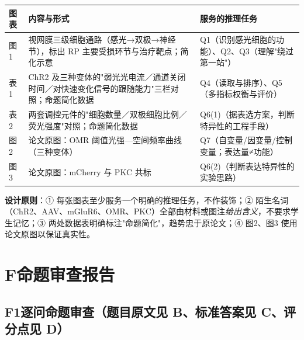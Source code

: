 \documentclass[UTF8,a4paper,11pt]{ctexart}
\begin{document}
\begin{longtable}{@{}p{1.4cm}p{6.2cm}p{6.0cm}@{}}
\toprule
\textbf{图表} & \textbf{内容与形式} & \textbf{服务的推理任务} \\
\midrule
\endhead
图1 & 视网膜三级细胞通路（感光→双极→神经节），标出 RP 主要受损环节与治疗靶点；简化示意 & Q1（识别感光细胞的功能）、Q2、Q3（理解"绕过第一站"） \\
表1 & ChR2 及三种变体的"弱光光电流／通道关闭时间／对快速变化信号的跟随能力"三栏对照；命题简化数据 & Q4（读取与排序）、Q5（多指标权衡与评价） \\
表2 & 两套调控元件的"细胞数量／双极细胞比例／荧光强度"对照；命题简化数据 & Q6(1)（据表选方案，判断特异性的工程手段） \\
图2 & 论文原图：OMR 阈值光强—空间频率曲线（三种变体） & Q7（自变量/因变量/控制变量；表达量≠功能） \\
图3 & 论文原图：mCherry 与 PKC 共标 & Q6(2)（判断表达特异性的实验思路） \\
\bottomrule
\end{longtable}

\noindent\textbf{设计原则}：① 每张图表至少服务一个明确的推理任务，不作装饰；② 陌生名词（ChR2、AAV、mGluR6、OMR、PKC）全部由材料或图注\emph{给出含义}，不要求学生记忆；③ 两处数据表明确标注"命题简化"，趋势忠于原论文；④ 图2、图3 使用论文原图以保证真实性。

\section{F\quad 命题审查报告}

\subsection*{F1\quad 逐问命题审查（题目原文见 B、标准答案见 C、评分点见 D）}
\end{document}
